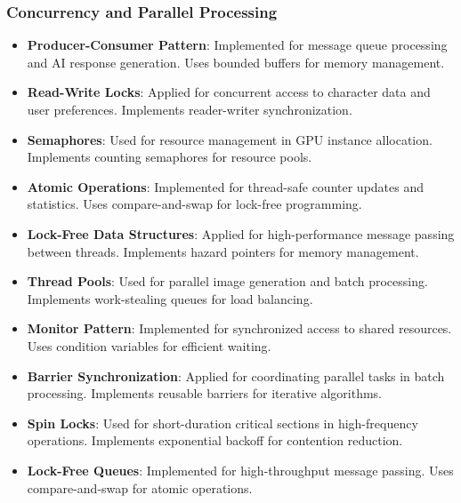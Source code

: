 \documentclass[conference]{IEEEtran}
\begin{document}
\subsubsection{Concurrency and Parallel Processing}
\begin{itemize}
\item \textbf{Producer-Consumer Pattern}: Implemented for message queue processing and AI response generation. Uses bounded buffers for memory management.
\item \textbf{Read-Write Locks}: Applied for concurrent access to character data and user preferences. Implements reader-writer synchronization.
\item \textbf{Semaphores}: Used for resource management in GPU instance allocation. Implements counting semaphores for resource pools.
\item \textbf{Atomic Operations}: Implemented for thread-safe counter updates and statistics. Uses compare-and-swap for lock-free programming.
\item \textbf{Lock-Free Data Structures}: Applied for high-performance message passing between threads. Implements hazard pointers for memory management.
\item \textbf{Thread Pools}: Used for parallel image generation and batch processing. Implements work-stealing queues for load balancing.
\item \textbf{Monitor Pattern}: Implemented for synchronized access to shared resources. Uses condition variables for efficient waiting.
\item \textbf{Barrier Synchronization}: Applied for coordinating parallel tasks in batch processing. Implements reusable barriers for iterative algorithms.
\item \textbf{Spin Locks}: Used for short-duration critical sections in high-frequency operations. Implements exponential backoff for contention reduction.
\item \textbf{Lock-Free Queues}: Implemented for high-throughput message passing. Uses compare-and-swap for atomic operations.
\end{itemize}
\end{document}
